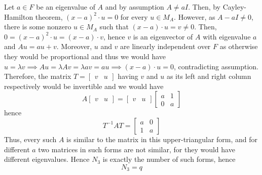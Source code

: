 \documentclass[8pt]{article} %
\begin{document}
\begin{enumerate}[label=\bfseries Problem \arabic*.]
{\begin{enumerate}[label=(\arabic*).]
{				Let $a\in F$ be an eigenvalue of $A$ and by assumption $A\neq aI$. Then, by Cayley-Hamilton theorem, $(x-a)^2\cdot u=0$ for every
				$u\in M_A$. However, as $A-aI\neq 0$, there is some nonzero
				$u\in M_A$ such that $(x-a)\cdot u=v\neq 0$. Then, $0=(x-a)^2\cdot u=(x-a)\cdot v$,
				hence $v$ is an eigenvector of $A$ with eigenvalue $a$ and $Au=au+v$. Moreover, $u$ and $v$ are linearly independent over $F$
				as otherwise they would be proportional and thus we would have
				$u=\lambda v\implies Au=\lambda Av=\lambda av=au\implies (x-a)\cdot u=0$, contradicting assumption. 
				Therefore, the matrix $T=\begin{bmatrix} v&u\end{bmatrix}$
				 having $v$ and $u$ as its left and right column respectively would be invertible and we would
				have
				\[A\begin{bmatrix}v&u\end{bmatrix}=\begin{bmatrix}v&u\end{bmatrix}\begin{bmatrix}a&1\\0&a\end{bmatrix}\]
				hence
				\[T^{-1}AT=\begin{bmatrix}a&0\\1&a\end{bmatrix}\]
				Thus, every such $A$ is similar to the matrix in this upper-triangular form, and for different $a$ two matrices
				in such forms are not similar, for they would have different eigenvalues. Hence $N_3$ is exactly the number of such forms, hence
				\[N_3=q\]
				

}
\end{enumerate}}
\end{enumerate}
\end{document}
